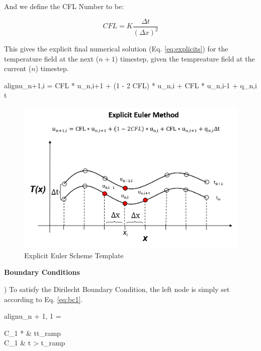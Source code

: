 \documentclass[10pt, letter, showtrims]{extarticle}
\newcommand{\boxedeq}[2]{\begin{empheq}[box={\fboxsep=6pt\fbox}]{align}\label{#1}#2\end{empheq}}
\begin{document}
		\vspace{1em}
		
		\noindent
		And we define the CFL Number to be:
		
		\begin{equation}
		\label{eq:cfl}
			CFL = K \frac{\Delta t}{(\Delta x)^{2}}
		\end{equation}
		
		\vspace{1em}
		
		\noindent
		This gives the explicit final numerical solution (Eq. \ref{eq:explicits}) for the temperature field at the next ($n + 1$) timestep, given the tempreature field at the current ($n$) timestep.
		
		\boxedeq{eq:explicits}{u_{n+1,i} = CFL * u_{n,i+1} + (1 - 2 CFL) * u_{n,i} + CFL * u_{n,i-1} + q_{n,i} \Delta t}
		
%		
		
		\FloatBarrier
		\begin{figure}[h]
			\centering
			\captionsetup{justification=centering}
			\includegraphics[width=0.65\linewidth]{"Figures/Explicit_Euler_Method"}
			\caption{Explicit Euler Scheme Template}
			\label{fig:explicit}
		\end{figure}
		\FloatBarrier
		
		\pagebreak
		
		\noindent
		\textbf{Boundary Conditions}
		
		) To satisfy the Dirilecht Boundary Condition, the left node is simply set according to Eq. \ref{eq:bc1}.
		
		\boxedeq{eq:explicitbc1}{u_{n + 1, 1} = \begin{cases} 
          					C_{1} * \frac{t}{t_{ramp}} & t\leq t_{ramp} \\
          					C_{1}                      & t > t_{ramp}
       					\end{cases}}
		
\end{document}
